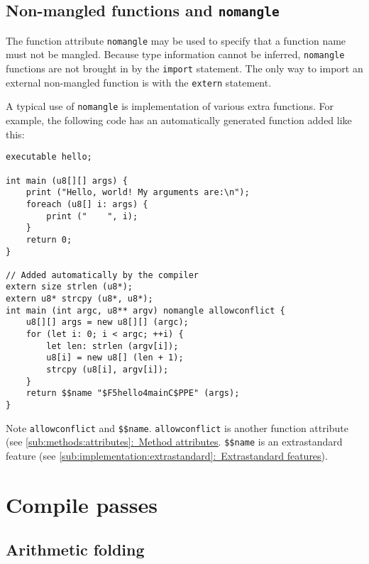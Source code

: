 \documentclass{article}
\newcommand{\textref}[2]{\hyperref[#1]{\underline{\ref*{#1}:~#2}}}
\begin{document}
\subsection{Non-mangled functions and \texttt{nomangle}}
\label{sub:cconv:nomangle}
The function attribute \texttt{nomangle} may be used to specify that a function
name must not be mangled. Because type information cannot be inferred,
\texttt{nomangle} functions are not brought in by the \texttt{import} statement.
The only way to import an external non-mangled function is with the
\texttt{extern} statement.

A typical use of \texttt{nomangle} is implementation of various extra functions.
For example, the following code has an automatically generated function added
like this:

\begin{verbatim}
executable hello;

int main (u8[][] args) {
    print ("Hello, world! My arguments are:\n");
    foreach (u8[] i: args) {
        print ("    ", i);
    }
    return 0;
}

// Added automatically by the compiler
extern size strlen (u8*);
extern u8* strcpy (u8*, u8*);
int main (int argc, u8** argv) nomangle allowconflict {
    u8[][] args = new u8[][] (argc);
    for (let i: 0; i < argc; ++i) {
        let len: strlen (argv[i]);
        u8[i] = new u8[] (len + 1);
        strcpy (u8[i], argv[i]);
    }
    return $$name "$F5hello4mainC$PPE" (args);
}
\end{verbatim}

Note \texttt{allowconflict} and \texttt{\$\$name}. \texttt{allowconflict} is
another function attribute (see
\textref{sub:methods:attributes}{Method attributes}.
\texttt{\$\$name} is an extrastandard feature
(see \textref{sub:implementation:extrastandard}{Extrastandard features}).

\section{Compile passes}
\label{sec:passes}

\subsection{Arithmetic folding}
\label{sub:passes:arithfold}
\end{document}
